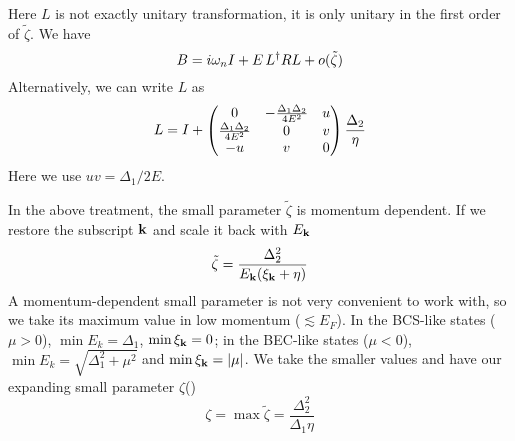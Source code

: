 Here $L$ is not exactly unitary transformation, it is only unitary in the first order of  $\tilde\zeta$. We have 
\[
B=i\omega_{n}I+E\,L^{\dagger}RL+o(\tilde\zeta)
\]
Alternatively, we can write $L$ as 
\begin{equation}
L=I+
\begin{pmatrix}0&-\frac{\Delta_{1}\Delta_{2}}{4E^{2}}&u\\
\frac{\Delta_{1}\Delta_{2}}{4E^{2}}&0&v\\
-u&v&0
\end{pmatrix}\frac{\Delta_{2}}{\eta}
\end{equation}
Here we use $uv=\Delta_{1}/2E$.

In the above treatment, the small parameter $\tilde\zeta$ is momentum dependent.  If we restore the subscript $\mathbf{k}$ and scale it  back with $E_{\mathbf{k}}$
\begin{equation}
\tilde\zeta=\frac{\Delta_{2}^{2}}{E_{\mathbf{k}}(\xi_{\mathbf{k}}+\eta)}
\end{equation}
A momentum-dependent small parameter is not very convenient to work with, so we take its maximum value in low momentum ($\lesssim{}E_{F}$).  In the BCS-like states ($\mu>0$), $\min{E_{k}}=\Delta_{1}$, $\min{\xi_{\ensuremath{\mathbf{k}}}}=0$; in the BEC-like states ($\mu<0$), $\min{E_{k}}=\sqrt{\Delta_{1}^{2}+\mu^{2}}$ and $\min{\xi_{\ensuremath{\mathbf{k}}}}=\left\lvert{\mu}\right\rvert$. We take the smaller values and have our expanding small parameter $\zeta$()
\begin{equation}
\zeta=\max\tilde{\zeta}=\frac{\Delta_{2}^{2}}{\Delta_{1}\eta}
\end{equation}


